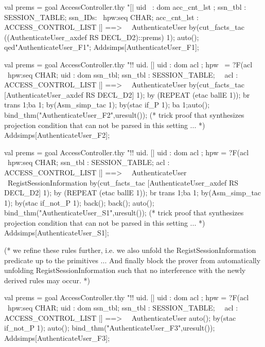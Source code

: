 \documentclass[a4paper,pdftex]{article}
\newenvironment{holz-proof}{\comment}{\endcomment}
\begin{document}
\begin{holz-proof}


val prems = goal AccessController.thy 
"[| uid ~: dom acc_cnt_lst ; ssn_tbl : SESSION_TABLE; ssn_IDs: %
\   hpw:seq CHAR; acc_cnt_lst : ACCESS_CONTROL_LIST |] ==>                    \
\ AuthenticateUser %
by(cut_facts_tac ((AuthenticateUser_axdef RS DECL_D2)::prems) 1);
auto();
qed"AuthenticateUser_F1";
Addsimps[AuthenticateUser_F1];


val prems = goal AccessController.thy 
"!! uid. [| uid : dom acl ; hpw ~= ?F(acl%
\           hpw:seq CHAR; uid : dom ssn_tbl; ssn_tbl : SESSION_TABLE;        \
\           acl : ACCESS_CONTROL_LIST |] ==>  \
\ AuthenticateUser %
by(cut_facts_tac [AuthenticateUser_axdef RS DECL_D2] 1);
by (REPEAT (etac ballE 1));
br trans 1;ba 1;
by(Asm_simp_tac 1);
by(stac if_P 1); ba 1;auto();
bind_thm("AuthenticateUser_F2",uresult());
(* trick proof that synthesizes projection condition that can
   not be parsed in this setting ... *)
Addsimps[AuthenticateUser_F2];


val prems = goal AccessController.thy 
"!! uid. [| uid : dom acl ; hpw = ?F(acl%
\   hpw:seq CHAR; ssn_tbl : SESSION_TABLE; acl : ACCESS_CONTROL_LIST |] ==> \
\ AuthenticateUser %
\ RegistSessionInformation %
by(cut_facts_tac [AuthenticateUser_axdef RS DECL_D2] 1);
by (REPEAT (etac ballE 1));
br trans 1;ba 1;
by(Asm_simp_tac 1);
by(stac if_not_P 1); back(); back();
auto();
bind_thm("AuthenticateUser_S1",uresult());
(* trick proof that synthesizes projection condition that can
   not be parsed in this setting ... *)
Addsimps[AuthenticateUser_S1];

(* we refine these rules further, i.e. we also unfold the 
   RegistSessionInformation predicate up to the primitives ...
   And finally block the prover from automatically unfolding
   RegistSessionInformation such that no interference with
   the newly derived rules may occur. *)

val prems = goal AccessController.thy 
"!! uid. [| uid : dom acl ; hpw = ?F(acl%
\           hpw:seq CHAR;  uid : dom ssn_tbl; ssn_tbl : SESSION_TABLE;      \
\           acl : ACCESS_CONTROL_LIST                          |] ==>       \
\ AuthenticateUser %
auto();
by(stac if_not_P 1); 
auto();
bind_thm("AuthenticateUser_F3",uresult());
Addsimps[AuthenticateUser_F3];


\end{holz-proof}
\end{document}
